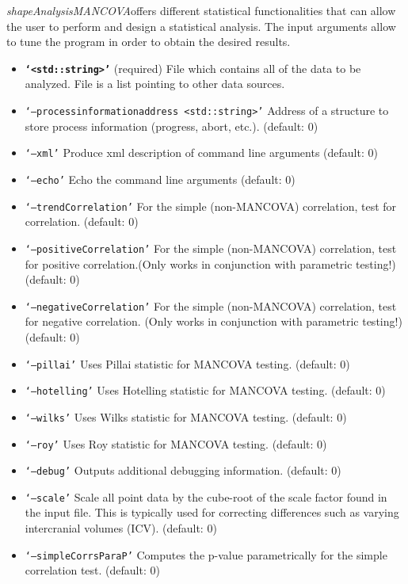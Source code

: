 \documentclass{InsightArticle}
\newcommand{\ProgramName}{\textit{shapeAnalysisMANCOVA}}
\begin{document}
\ProgramName offers different statistical functionalities that can allow the user to perform and design a statistical analysis. The input arguments allow to tune the program in order to obtain the desired results.

\begin{itemize}
	\item \texttt{\textbf{\small {`<std::string>'}}}  (required)  File which contains all of the data to be analyzed. File is a list pointing to other data sources.
	\item \texttt{\small {`--processinformationaddress <std::string>'}}  Address of a structure to store process information (progress, abort, etc.). (default: 0)
	\item \texttt{\small {`--xml'}}  Produce xml description of command line arguments (default: 0)
	\item \texttt{\small {`--echo'}}  Echo the command line arguments (default: 0)
	\item \texttt{\small {`--trendCorrelation'}}  For the simple (non-MANCOVA) correlation, test for correlation. (default: 0)
	\item \texttt{\small {`--positiveCorrelation'}}  For the simple (non-MANCOVA) correlation, test for positive correlation.(Only works in conjunction with parametric testing!)     (default: 0)
	\item \texttt{\small {`--negativeCorrelation'}}  For the simple (non-MANCOVA) correlation, test for negative correlation. (Only works in conjunction with parametric testing!)      (default: 0)
	\item \texttt{\small {`--pillai'}}  Uses Pillai statistic for MANCOVA testing. (default: 0)
   	\item \texttt{\small {`--hotelling'}}  Uses Hotelling statistic for MANCOVA testing. (default: 0)
     	\item \texttt{\small {`--wilks'}}  Uses Wilks statistic for MANCOVA testing. (default: 0)
     	\item \texttt{\small {`--roy'}}  Uses Roy statistic for MANCOVA testing. (default: 0)
     	\item \texttt{\small {`--debug'}}  Outputs additional debugging information. (default: 0)
     	\item \texttt{\small {`--scale'}}  Scale all point data by the cube-root of the scale factor found in the input file. This is typically used for correcting differences such as      varying intercranial volumes (ICV). (default: 0)
     	\item \texttt{\small {`--simpleCorrsParaP'}}  Computes the p-value parametrically for the simple correlation test. (default: 0)

\end{itemize}
\end{document}
